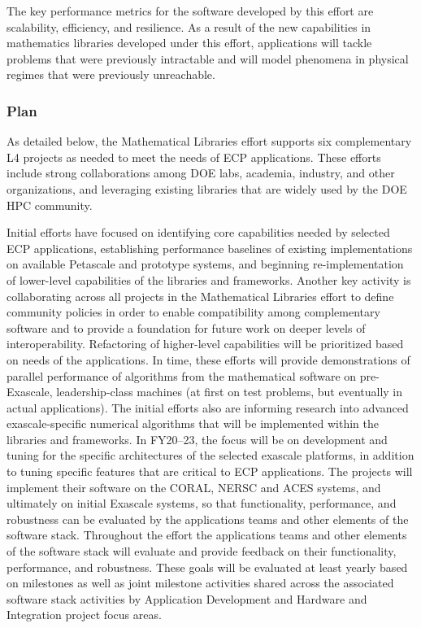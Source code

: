 The key performance metrics for the software developed by this effort are scalability, efficiency, and resilience. As a result of the new capabilities in mathematics libraries developed under this effort, applications will tackle problems that were previously intractable and will model phenomena in physical regimes that were previously unreachable.

\subsubsection{Plan}
As detailed below, the Mathematical Libraries effort supports six complementary L4 projects as needed to meet the needs of ECP applications. These efforts include strong collaborations among DOE labs, academia, industry, and other organizations, and leveraging existing libraries that are widely used by the DOE HPC community. 

Initial efforts have focused on identifying core capabilities needed by selected ECP applications, establishing performance baselines of existing implementations on available Petascale and prototype systems, and beginning re-implementation of lower-level capabilities of the libraries and frameworks. Another key activity is collaborating across all projects in the Mathematical Libraries effort to define community policies in order to enable compatibility among complementary software and to provide a foundation for future work on deeper levels of interoperability. Refactoring of higher-level capabilities will be prioritized based on needs of the applications. In time, these efforts will provide demonstrations of parallel performance of algorithms from the mathematical software on pre-Exascale, leadership-class machines (at first on test problems, but eventually in actual applications). The initial efforts also are informing research into advanced exascale-specific numerical algorithms that will be implemented within the libraries and frameworks. In FY20–23, the focus will be on development and tuning for the specific architectures of the selected exascale platforms, in addition to tuning specific features that are critical to ECP applications. The projects will implement their software on the CORAL, NERSC and ACES systems, and ultimately on initial Exascale systems, so that functionality, performance, and robustness can be evaluated by the applications teams and other elements of the software stack. Throughout the effort the applications teams and other elements of the software stack will evaluate and provide feedback on their functionality, performance, and robustness. These goals will be evaluated at least yearly based on milestones as well as joint milestone activities shared across the associated software stack activities by Application Development and Hardware and Integration project focus areas.


